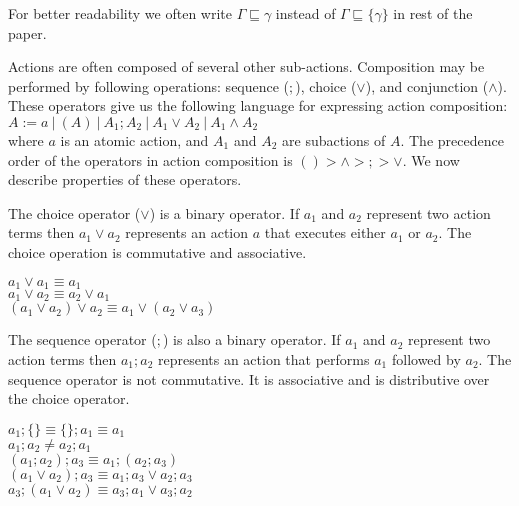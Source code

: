 \documentclass[12pt,journal,letterpaper,onecolumn]{IEEEtran}
\begin{document}
For better readability we often write
$\Gamma \sqsubseteq \gamma$ instead of $\Gamma \sqsubseteq \{\gamma\}$
in rest of the paper.

Actions are often composed of several other sub-actions. Composition
may be performed by following operations: sequence ($;$), choice
($\vee$), and conjunction ($\wedge$). These operators give us the
following language for
expressing action composition: \\
\indent $A := a ~|~ (A) ~|~ A_1 ; A_2 ~|~ A_1 \vee A_2 ~|~ A_1 \wedge A_2$\\
where $a$ is an atomic action, and $A_1$ and $A_2$ are subactions of
$A$.  The precedence order of the operators in action composition is
$() > \wedge > ; > \vee$. We now describe properties of these
operators.

The choice operator ($\vee$) is a binary operator. If $a_1$ and
$a_2$ represent two action terms then $a_1 \vee a_2$ represents an
 action $a$ that executes either $a_1$ or
$a_2$. The choice operation is commutative and associative.
\begin{center}
\begin{minipage}{4.5in}
\begin{multicols}{2}
$a_1 \vee a_1 \equiv a_1$ \\
$a_1 \vee a_2 \equiv a_2 \vee a_1$ \\
$(a_1 \vee a_2) \vee a_2 \equiv a_1 \vee (a_2 \vee a_3)$
\end{multicols}
\end{minipage}
\end{center}


The sequence operator ($;$) is also a binary operator. If $a_1$ and
$a_2$ represent two action terms then $a_1;a_2$ represents an action
that performs $a_1$ followed by $a_2$. The sequence operator is not
commutative. It is associative and is distributive over the choice
operator.
\begin{center}
\begin{minipage}{4.5in}
\begin{multicols}{2}
$a_1;\{\} \equiv \{\};a_1 \equiv a_1$\\
$a_1 ; a_2 \neq a_2 ; a_1$ \\
$(a_1;a_2);a_3 \equiv a_1; (a_2;a_3)$ \\
$(a_1 \vee a_2);a_3 \equiv a_1;a_3 \vee a_2;a_3$\\
$ a_3;(a_1 \vee a_2) \equiv a_3;a_1 \vee a_3;a_2$
\end{multicols}
\end{minipage}
\end{center}
\end{document}
